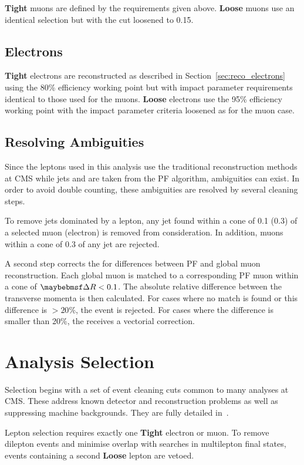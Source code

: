 \textbf{Tight} muons are defined by the requirements given above. \textbf{Loose}
muons use an identical selection but with the \CombIso cut loosened to 0.15.

\subsection{Electrons}
\textbf{Tight} electrons are reconstructed as described in
Section~\ref{sec:reco_electrons} using the 80\% efficiency working point but
with impact parameter requirements identical to those used for the
muons. \textbf{Loose} electrons use the 95\% efficiency working point with the
impact parameter criteria loosened as for the muon case.

\subsection{Resolving Ambiguities}
Since the leptons used in this analysis use the traditional reconstruction
methods at \ac{CMS} while jets and \METv are taken from the \ac{PF} algorithm,
ambiguities can exist. In order to avoid double counting, these ambiguities are
resolved by several cleaning steps.

To remove jets dominated by a lepton, any jet found within a cone of 0.1 (0.3)
of a selected muon (electron) is removed from consideration. In addition, muons
within a cone of 0.3 of any jet are rejected.

A second step corrects the \METv for differences between \ac{PF} and global muon
reconstruction. Each global muon is matched to a corresponding \ac{PF} muon
within a cone of $\DeltaR < 0.1$. The absolute relative difference between the
transverse momenta is then calculated. For cases where no match is found or this
difference is $> 20\%$, the event is rejected. For cases where the difference is
smaller than 20\%, the \METv receives a vectorial correction.

\section{Analysis Selection}
Selection begins with a set of event cleaning cuts common to many analyses at
\ac{CMS}. These address known detector and reconstruction problems as well as
suppressing machine backgrounds. They are fully detailed
in~\cite{susy_selection_an}.

Lepton selection requires exactly one \textbf{Tight} electron or muon. To remove
dilepton events and minimise overlap with searches in multilepton final states,
events containing a second \textbf{Loose} lepton are vetoed.

